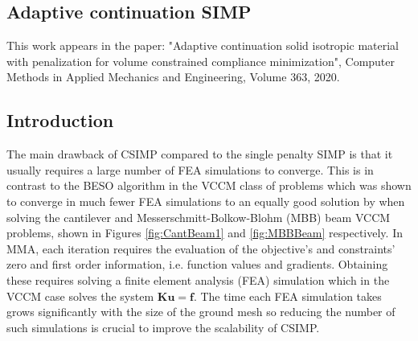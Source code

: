 \begin{titlepage}\centering
\vspace*{\fill}

\chapter{Adaptive continuation SIMP}\thispagestyle{EmptyHeader}
\label{chp:2}

\begin{tcolorbox}
This work appears in the paper: "Adaptive continuation solid isotropic material with penalization for volume constrained compliance minimization", Computer Methods in Applied Mechanics and Engineering, Volume 363, 2020. \citep{TAREK2020112880}
\end{tcolorbox}

\vspace*{\fill}
\end{titlepage}

\newpage

\section{Introduction}

The main drawback of CSIMP compared to the single penalty SIMP is that it usually requires a large number of FEA simulations to converge. This is in contrast to the BESO algorithm in the VCCM class of problems which was shown to converge in much fewer FEA simulations to an equally good solution by \cite{Huang2010a} when solving the cantilever and Messerschmitt-Bolkow-Blohm (MBB) beam VCCM problems, shown in Figures \ref{fig:CantBeam1} and \ref{fig:MBBBeam} respectively. In MMA, each iteration requires the evaluation of the objective's and constraints' zero and first order information, i.e. function values and gradients. Obtaining these requires solving a finite element analysis (FEA) simulation which in the VCCM case solves the system $\bm{K}\bm{u}=\bm{f}$. The time each FEA simulation takes grows significantly with the size of the ground mesh so reducing the number of such simulations is crucial to improve the scalability of CSIMP.




